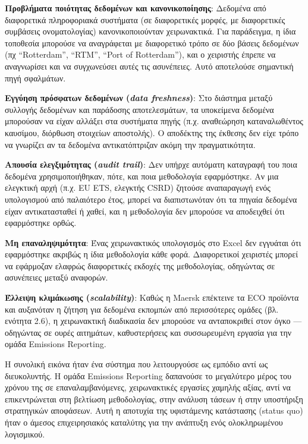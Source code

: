 \documentclass[11pt,a4paper,greek,twoside]{template-xe}
\begin{document}
\textbf{Προβλήματα ποιότητας δεδομένων και κανονικοποίησης}: Δεδομένα
από διαφορετικά πληροφοριακά συστήματα (σε διαφορετικές μορφές, με
διαφορετικές συμβάσεις ονοματολογίας) κανονικοποιούνταν χειρωνακτικά.
Για παράδειγμα, η ίδια τοποθεσία μπορούσε να αναγράφεται με διαφορετικό
τρόπο σε δύο βάσεις δεδομένων (πχ ``Rotterdam'', ``RTM'', ``Port of
Rotterdam''), και ο χειριστής έπρεπε να αναγνωρίσει και να συγχωνεύσει
αυτές τις ασυνέπειες. Αυτό αποτελούσε σημαντική πηγή σφαλμάτων.

\textbf{Εγγύηση πρόσφατων δεδομένων (\emph{data freshness})}: Στο
διάστημα μεταξύ συλλογής δεδομένων και παράδοσης αποτελεσμάτων, τα
υποκείμενα δεδομένα μπορούσαν να είχαν αλλάξει στα συστήματα πηγής (π.χ.
αναθεώρηση καταναλωθέντος καυσίμου, διόρθωση στοιχείων αποστολής). Ο
αποδέκτης της έκθεσης δεν είχε τρόπο να γνωρίζει αν τα δεδομένα
αντικατόπτριζαν ακόμη την πραγματικότητα.

\textbf{Απουσία ελεγξιμότητας (\emph{audit trail})}: Δεν υπήρχε αυτόματη
καταγραφή του ποια δεδομένα χρησιμοποιήθηκαν, πότε, και ποια μεθοδολογία
εφαρμόστηκε. Αν μια ελεγκτική αρχή (π.χ. EU ETS, ελεγκτής CSRD) ζητούσε
αναπαραγωγή ενός υπολογισμού από παλαιότερο έτος, μπορεί να
διαπιστωνόταν ότι τα πηγαία δεδομένα είχαν αντικατασταθεί ή χαθεί, και η
μεθοδολογία δεν μπορούσε να αποδειχθεί ότι εφαρμόστηκε ορθώς.

\textbf{Μη επαναληψιμότητα}: Ένας χειρωνακτικός υπολογισμός στο Excel
δεν εγγυάται ότι εφαρμόστηκε ακριβώς η ίδια μεθοδολογία κάθε φορά.
Διαφορετικοί χειριστές μπορεί να εφάρμοζαν ελαφρώς διαφορετικές εκδοχές
της μεθοδολογίας, οδηγώντας σε ασυνέπειες μεταξύ αναφορών.

\textbf{Έλλειψη κλιμάκωσης (\emph{scalability})}: Καθώς η Maersk
επέκτεινε τα ECO προϊόντα και αυξανόταν η ζήτηση για δεδομένα εκπομπών
από περισσότερες ομάδες (βλ. ενότητα 2.6), η χειρωνακτική διαδικασία δεν
μπορούσε να ανταποκριθεί στον όγκο --- οδηγώντας σε ουρές αιτημάτων,
καθυστερήσεις και συσσωρευμένη εργασία για την ομάδα Emissions
Reporting.

Η συνολική εικόνα ήταν ένα σύστημα που λειτουργούσε ως εμπόδιο αντί ως
διευκολυντής. Η ομάδα Emissions Reporting δαπανούσε το μεγαλύτερο μέρος
του χρόνου της σε επαναλαμβανόμενες, χειρωνακτικές εργασίες χαμηλής
αξίας, αντί να επικεντρώνεται στη βελτίωση μεθοδολογίας, στην ανάλυση
τάσεων ή στην υποστήριξη στρατηγικών αποφάσεων. Αυτή η αποτυχία της
υφιστάμενης κατάστασης (status quo) ήταν ο άμεσος επιχειρησιακός
καταλύτης για την ανάπτυξη ενός ολοκληρωμένου λογισμικού.
\end{document}
